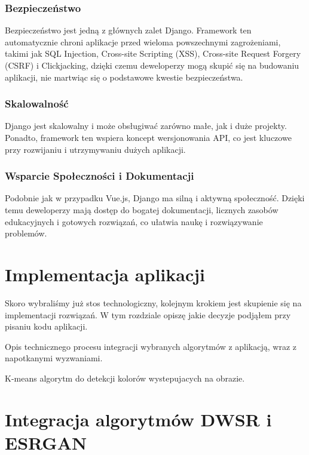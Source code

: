 \subsubsection*{Bezpieczeństwo}

Bezpieczeństwo jest jedną z głównych zalet Django. Framework ten automatycznie chroni aplikacje przed wieloma powszechnymi zagrożeniami, takimi jak SQL Injection, Cross-site Scripting (XSS), Cross-site Request Forgery (CSRF) i Clickjacking, dzięki czemu deweloperzy mogą skupić się na budowaniu aplikacji, nie martwiąc się o podstawowe kwestie bezpieczeństwa.

\subsubsection*{Skalowalność}

Django jest skalowalny i może obsługiwać zarówno małe, jak i duże projekty. Ponadto, framework ten wspiera koncept wersjonowania API, co jest kluczowe przy rozwijaniu i utrzymywaniu dużych aplikacji.

\subsubsection*{Wsparcie Społeczności i Dokumentacji}

Podobnie jak w przypadku Vue.js, Django ma silną i aktywną społeczność. Dzięki temu deweloperzy mają dostęp do bogatej dokumentacji, licznych zasobów edukacyjnych i gotowych rozwiązań, co ułatwia naukę i rozwiązywanie problemów.


\section{Implementacja aplikacji}

Skoro wybraliśmy już stos technologiczny, kolejnym krokiem jest skupienie się na implementacji rozwiązań. W tym rozdziale opiszę jakie decyzje podjąłem przy pisaniu kodu aplikacji.






Opis technicznego procesu integracji wybranych algorytmów z aplikacją, wraz z napotkanymi wyzwaniami.

K-means algorytm do detekcji kolorów wystepujacych na obrazie.



\section{Integracja algorytmów DWSR i ESRGAN}




